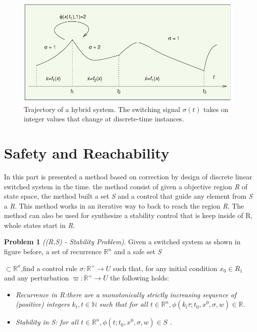 \begin{figure}[!h]
    \begin{center}
        \includegraphics[width=\textwidth*4/5]{../../images/swiched}
        \caption{Trajectory of a hybrid system. The switching signal
        ${\sigma(t)}$ takes on integer values that change at 
        discrete-time instances.\citep{liberzon2003switching}}
    \end{center}
\end{figure}

\section{Safety and Reachability}

In this part is presented a method based on correction by design of
 discrete linear switched system in the time. the method consist of 
 given a objective region \emph{R} of state space, the method built 
 a set \emph{S} and a control that guide any element from  \emph{S} 
 a \emph{R}. This method works in an iterative way to back to reach 
 the region \emph{R}. The method  can also be used for synthesize 
 a stability control that is keep inside of R, whole states start in
  \emph{R}. \cite{le2016distributed}


 \textbf{Problem 1} \emph{((R,S) - Stability Problem)}. Given a 
 switched system as shown in figure before, a set of recurrence 
 ${\mathbb{R}^n}$ and a safe set \emph{S}
 
 ${\subset \mathbb{R}^n}$,find a control rule 
 ${\sigma : \mathbb{R}^+ \rightarrow U}$ such that, for any
  initial condition ${x_0  \in  R_1}$ and any perturbation 
  ${\varpi :\mathbb{R}^+\rightarrow U}$  the
   following holds:
 
 \begin{itemize}
    \item \emph{ Recurrence in \emph{R}:there are a monotonically 
    strictly increasing sequence of (positive) integers
    ${k_t, t \in \mathbb{N}}$ such that for all ${ t \in \mathbb{R}^n,
    \phi(k_l\tau;t_0,x^0,\sigma,w) \in \mathbb{R} }$.}

    \item \emph{ Stability in \emph{S}: for all ${ t \in \mathbb{R}^n,
    \phi(t;t_0,x^0,\sigma,w) \in S}$ .}
\end{itemize}
 
